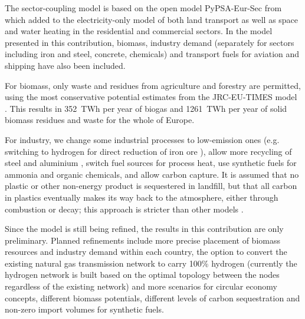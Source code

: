 The sector-coupling model is based on the open model PyPSA-Eur-Sec from
\cite{BROWN2018720} which added to the electricity-only model of
\cite{Schlachtberger2017} both land transport as well as space and water heating
in the residential and commercial sectors. In the model presented in this
contribution, biomass, industry demand (separately for sectors including iron
and steel, concrete, chemicals) and transport fuels for aviation and shipping
have also been included.

For biomass, only waste and residues from agriculture and forestry are
permitted, using the most conservative potential estimates from the JRC-EU-TIMES
model \cite{jrcbiomass2015}. This results in 352~TWh per year of biogas and
1261~TWh per year of solid biomass residues and waste for the whole of Europe.

For industry, we change some industrial processes to low-emission ones (e.g.
switching to hydrogen for direct reduction of iron ore \cite{Vogl_2018}), allow
more recycling of steel and aluminium \cite{circular_economy}, switch fuel
sources for process heat, use synthetic fuels for ammonia and organic chemicals,
and allow carbon capture. It is assumed that no plastic or other non-energy
product is sequestered in landfill, but that all carbon in plastics eventually
makes its way back to the atmosphere, either through combustion or decay; this
approach is stricter than other models \cite{in-depth_2018}.

Since the model is still being refined, the results in this contribution are
only preliminary. Planned refinements include more precise placement of biomass
resources and industry demand within each country, the option to convert the
existing natural gas transmission network to carry 100\% hydrogen (currently the
hydrogen network is built based on the optimal topology between the nodes
regardless of the existing network) and more scenarios for circular economy
concepts, different biomass potentials, different levels of carbon sequestration
and non-zero import volumes for synthetic fuels.